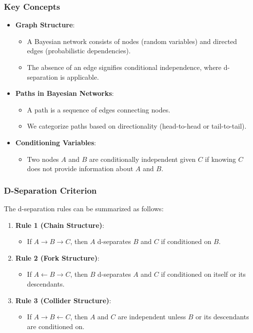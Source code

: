 \documentclass[aspectratio=169]{beamer}
\begin{document}
\begin{frame}[fragile]
    \frametitle{Key Concepts}
    \begin{itemize}
        \item \textbf{Graph Structure}:
            \begin{itemize}
                \item A Bayesian network consists of nodes (random variables) and directed edges (probabilistic dependencies).
                \item The absence of an edge signifies conditional independence, where d-separation is applicable.
            \end{itemize}
        \item \textbf{Paths in Bayesian Networks}:
            \begin{itemize}
                \item A path is a sequence of edges connecting nodes.
                \item We categorize paths based on directionality (head-to-head or tail-to-tail).
            \end{itemize}
        \item \textbf{Conditioning Variables}:
            \begin{itemize}
                \item Two nodes \(A\) and \(B\) are conditionally independent given \(C\) if knowing \(C\) does not provide information about \(A\) and \(B\).
            \end{itemize}
    \end{itemize}
\end{frame}

\begin{frame}[fragile]
    \frametitle{D-Separation Criterion}
    The d-separation rules can be summarized as follows:
    
    \begin{enumerate}
        \item \textbf{Rule 1 (Chain Structure)}:
            \begin{itemize}
                \item If \(A \rightarrow B \rightarrow C\), then \(A\) d-separates \(B\) and \(C\) if conditioned on \(B\).
            \end{itemize}
        \item \textbf{Rule 2 (Fork Structure)}:
            \begin{itemize}
                \item If \(A \leftarrow B \rightarrow C\), then \(B\) d-separates \(A\) and \(C\) if conditioned on itself or its descendants.
            \end{itemize}
        \item \textbf{Rule 3 (Collider Structure)}:
            \begin{itemize}
                \item If \(A \rightarrow B \leftarrow C\), then \(A\) and \(C\) are independent unless \(B\) or its descendants are conditioned on.
            \end{itemize}
    \end{enumerate}
\end{frame}
\end{document}

